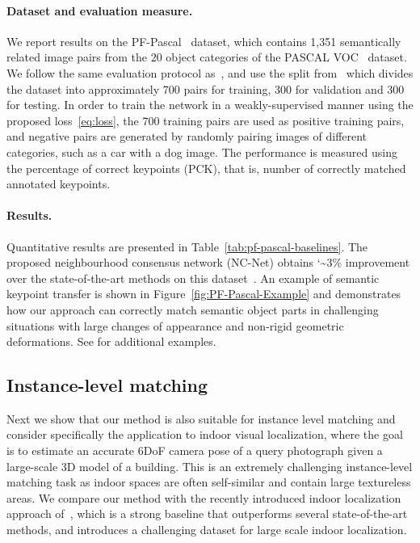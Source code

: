 \documentclass{article}
\begin{document}
\paragraph{Dataset and evaluation measure.}
We report results on the PF-Pascal~\cite{ham2017proposal} dataset, which contains 1,351 semantically related image pairs from the 20 object categories of the PASCAL VOC~\cite{pascal-voc-2011} dataset. We follow the same evaluation protocol as~\cite{scnet,Rocco18}, and use the split from~\cite{scnet} which divides the dataset into approximately 700 pairs for training, 300 for validation and 300 for testing. In order to train the network in a weakly-supervised manner using the proposed loss~\eqref{eq:loss}, the 700 training pairs are used as positive training pairs, and negative pairs are generated by randomly pairing images of different categories, such as a car with a dog image. The performance is measured using the percentage of correct keypoints (PCK), that is, number of correctly matched annotated keypoints.
\paragraph{Results.}
Quantitative results are presented in Table~\ref{tab:pf-pascal-baselines}. The proposed neighbourhood consensus network (NC-Net) obtains {\char`\~}3\% improvement over the state-of-the-art methods on this dataset~\cite{Rocco18}.
An example of semantic keypoint transfer is shown in Figure~\ref{fig:PF-Pascal-Example} and demonstrates how our approach can correctly match semantic object parts in challenging situations with large changes of appearance and non-rigid geometric deformations. See  for additional examples.
\subsection{Instance-level matching}
Next we show that our method is also suitable for instance level matching and consider specifically the application to indoor visual localization, where the goal is to estimate an accurate 6DoF camera pose of a query photograph given a large-scale 3D model of a building. This is an extremely challenging instance-level matching task as indoor spaces are often self-similar and contain large textureless areas. We compare our method with the recently introduced indoor localization approach of~\cite{Taira18}, which is a strong baseline that outperforms several state-of-the-art methods, and introduces a challenging dataset for large scale indoor localization.
\end{document}
